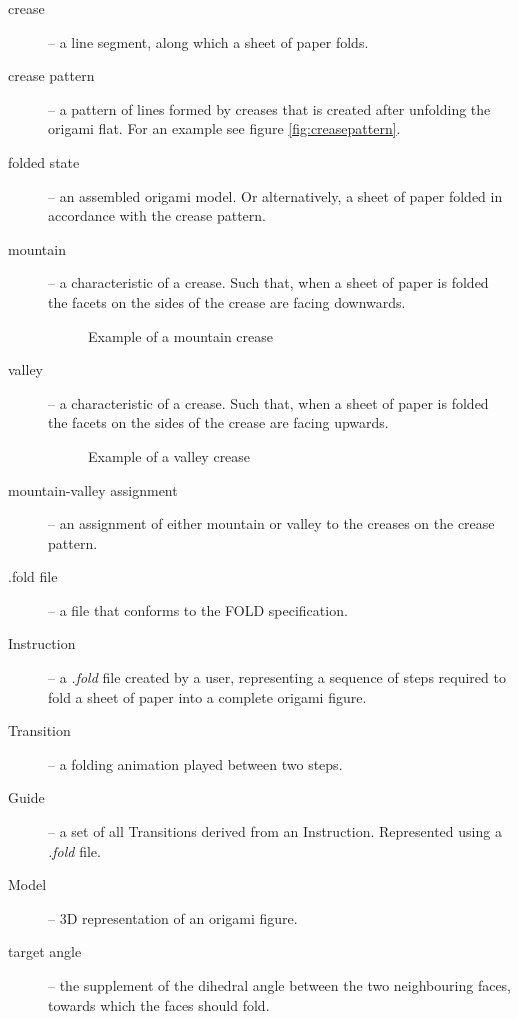 \begin{description}
	\item[crease] -- a line segment, along which a sheet of paper folds.
	\item[crease pattern] \label{dictionary:crease-pattern} -- a pattern of lines formed by creases that is created after unfolding the origami flat. For an example see figure \ref{fig:creasepattern}.
	\item[folded state] \label{dictionary:folded-state} -- an assembled origami model. Or alternatively, a sheet of paper folded in accordance with the crease pattern.
	\item[mountain] -- a characteristic of a crease. Such that, when a sheet of paper is folded the facets on the sides of the crease are facing downwards.
					\begin{figure}[H]
						\caption{Example of a mountain crease}
						\centering
					\end{figure}
	\item[valley] -- a characteristic of a crease. Such that, when a sheet of paper is folded the facets on the sides of the crease are facing upwards.
					\begin{figure}[H]
						\caption{Example of a valley crease}
						\centering
					\end{figure}
	\item[mountain-valley assignment] -- an assignment of either mountain or valley to the creases on the crease pattern.
	\item[.fold file] -- a file that conforms to the FOLD\cite{fold:paper} specification.
	\item[Instruction] -- a \textit{.fold} file created by a user, representing a sequence of steps required to
		fold a sheet of paper into a complete origami figure.
	\item[Transition] -- a folding animation played between two steps.
	\item[Guide] -- a set of all Transitions derived from an Instruction. Represented using a \textit{.fold} file.
	\item[Model] -- 3D representation of an origami figure. 
	\item[target angle] -- the supplement of the dihedral angle between the two neighbouring faces,
		towards which the faces should fold.
\end{description}

